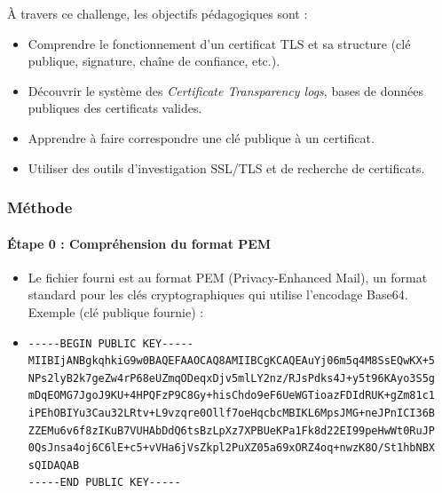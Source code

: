\documentclass[12pt, a4paper]{article}
\begin{document}
            À travers ce challenge, les objectifs pédagogiques sont :
            \begin{itemize}
                \item Comprendre le fonctionnement d’un certificat TLS et sa structure (clé publique, signature, chaîne de confiance, etc.).
                \item Découvrir le système des \emph{Certificate Transparency logs}, bases de données publiques des certificats valides.
                \item Apprendre à faire correspondre une clé publique à un certificat.
                \item Utiliser des outils d’investigation SSL/TLS et de recherche de certificats.
            \end{itemize}
        
        \subsubsection{Méthode}
            \paragraph{Étape 0 : Compréhension du format PEM}
            \begin{itemize} 
            \item Le fichier fourni est au format PEM (Privacy-Enhanced Mail), un format standard pour les clés cryptographiques qui utilise l'encodage Base64. Exemple (clé publique fournie) :
            
\item\begin{verbatim}
-----BEGIN PUBLIC KEY-----
MIIBIjANBgkqhkiG9w0BAQEFAAOCAQ8AMIIBCgKCAQEAuYj06m5q4M8SsEQwKX+5
NPs2lyB2k7geZw4rP68eUZmqODeqxDjv5mlLY2nz/RJsPdks4J+y5t96KAyo3S5g
mDqEOMG7JgoJ9KU+4HPQFzP9C8Gy+hisChdo9eF6UeWGTioazFDIdRUK+gZm81c1
iPEhOBIYu3Cau32LRtv+L9vzqre0Ollf7oeHqcbcMBIKL6MpsJMG+neJPnICI36B
ZZEMu6v6f8zIKuB7VUHAbDdQ6tsBzLpXz7XPBUeKPa1Fk8d22EI99peHwWt0RuJP
0QsJnsa4oj6C6lE+c5+vVHa6jVsZkpl2PuXZ05a69xORZ4oq+nwzK8O/St1hbNBX
sQIDAQAB
-----END PUBLIC KEY-----
\end{verbatim}
\end{itemize}
\end{document}
